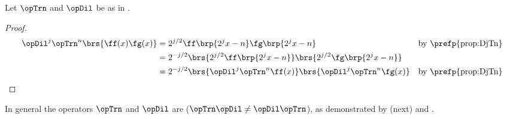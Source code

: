 \begin{proposition}
\label{prop:DjTnfg}
Let $\opTrn$ and $\opDil$ be as in .
\end{proposition}
\begin{proof}
  \begin{align*}
    \opDil^j\opTrn^n\brs{\ff(x)\fg(x)}
      &= 2^{j/2}
         \ff\brp{2^jx-n}
         \fg\brp{2^jx-n}
      && \text{by \prefp{prop:DjTn}}
    \\&= 2^{-j/2}
         \brs{2^{j/2}\ff\brp{2^jx-n}}
         \brs{2^{j/2}\fg\brp{2^jx-n}}
    \\&= 2^{-j/2}
         \brs{\opDil^j\opTrn^n\ff(x)} \brs{\opDil^j\opTrn^n\fg(x)}
      && \text{by \prefp{prop:DjTn}}
  \end{align*}
\end{proof}

In general the operators $\opTrn$ and $\opDil$ are  ($\opTrn\opDil\neq\opDil\opTrn$),
as demonstrated by  (next) and .
\begin{counterex}
\label{cnt:DTTD}
\end{counterex}

